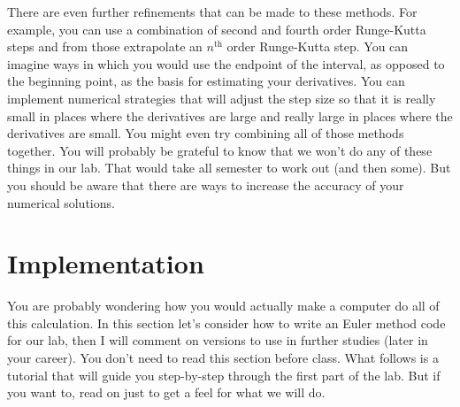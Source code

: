 \documentclass{book}
\begin{document}
There are even further refinements that can be made to these methods. For
example, you can use a combination of second and fourth order Runge-Kutta
steps and from those extrapolate an $n^{\text{th}}$ order Runge-Kutta step.
You can imagine ways in which you would use the endpoint of the interval, as
opposed to the beginning point, as the basis for estimating your derivatives.
You can implement numerical strategies that will adjust the step size so that
it is really small in places where the derivatives are large and really large
in places where the derivatives are small. You might even try combining all of
those methods together. You will probably be grateful to know that we won't do
any of these things in our lab. That would take all semester to work out (and
then some). But you should be aware that there are ways to increase the
accuracy of your numerical solutions.

\section{Implementation}

You are probably wondering how you would actually make a computer do all of
this calculation. In this section let's consider how to write an Euler method
code for our lab, then I will comment on versions to use in further studies
(later in your career). You don't need to read this section before class. What
follows is a tutorial that will guide you step-by-step through the first part
of the lab. But if you want to, read on just to get a feel for what we will do.
\end{document}
